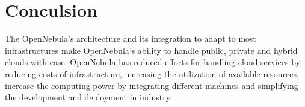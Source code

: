 \documentclass[9pt,twocolumn,twoside]{../../styles/osajnl}
\begin{document}
\section{Conculsion}

The OpenNebula's architecture and its integration to adapt to most 
infrastructures make OpenNebula's ability to handle public, private and hybrid
clouds with ease. OpenNebula has reduced  efforts for handling cloud services 
 by reducing costs of infrastructure, increasing the utilization of available resources, 
increase the computing power by integrating different machines and simplifying the 
development and deployment in industry. 


\end{document}
